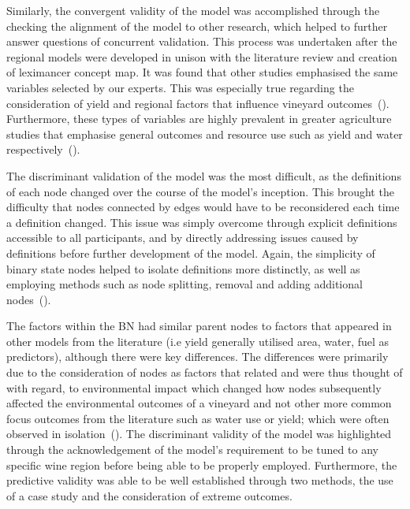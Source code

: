 \documentclass[fleqn,10pt]{wlscirep}
\begin{document}
Similarly, the convergent validity of the model was accomplished through the checking the alignment of the model to other research, which helped to further answer questions of concurrent validation. This process was undertaken after the regional models were developed in unison with the literature review and creation of leximancer concept map. It was found that other studies emphasised the same variables selected by our experts. This was especially true regarding the consideration of yield and regional factors that influence vineyard outcomes~(\cite{abbalDecisionSupportSystem2016,campsGrapeHarvestYield2012,hallWithinseasonTemporalVariation2011}). Furthermore, these types of variables are highly prevalent in greater agriculture studies that emphasise general outcomes and resource use such as yield and water respectively~(\cite{heFruitYieldPrediction2022,laurentLocalInfluenceClimate2022}).

The discriminant validation of the model was the most difficult, as the definitions of each node changed over the course of the model's inception. This brought the difficulty that nodes connected by edges would have to be reconsidered each time a definition changed. This issue was simply overcome through explicit definitions accessible to all participants, and by directly addressing issues caused by definitions before further development of the model. Again, the simplicity of binary state nodes helped to isolate definitions more distinctly, as well as employing methods such as node splitting, removal and adding additional nodes~(\cite{korbBayesianArtificialIntelligence2011}).

The factors within the BN had similar parent nodes to factors that appeared in other models from the literature (i.e yield generally utilised area, water, fuel as predictors), although there were key differences. The differences were primarily due to the consideration of nodes as factors that related and were thus thought of with regard, to environmental impact which changed how nodes subsequently affected the environmental outcomes of a vineyard and not other more common focus outcomes from the literature such as water use or yield; which were often observed in isolation~(\cite{laurentReviewIssuesMethods2021}). The discriminant validity of the model was highlighted through the acknowledgement of the model's requirement to be tuned to any specific wine region before being able to be properly employed. Furthermore, the predictive validity was able to be well established through two methods, the use of a case study and the consideration of extreme outcomes.
\end{document}
